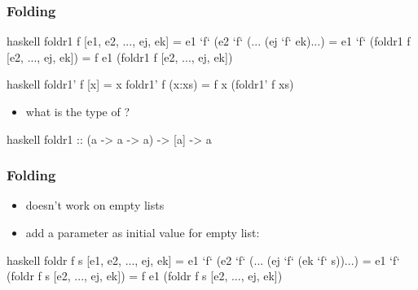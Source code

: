 \documentclass[dvipsnames]{beamer}
\theoremstyle{plain}
\begin{document}
\begin{frame}[fragile]
  \frametitle{Folding}

  \begin{block}{}
    \begin{pygments}{haskell}
foldr1 f [e1, e2, ..., ej, ek]
    = e1 `f` (e2 `f` (... (ej `f` ek)...)
    = e1 `f` (foldr1 f [e2, ..., ej, ek])
    = f e1 (foldr1 f [e2, ..., ej, ek])
    \end{pygments}
  \end{block}

  \pause
  \begin{exampleblock}{}
    \begin{pygments}{haskell}
foldr1' f [x]    = x
foldr1' f (x:xs) = f x (foldr1' f xs)
    \end{pygments}
  \end{exampleblock}

  \begin{itemize}
    \item what is the type of ?
  \end{itemize}

  \pause
  \begin{pygments}{haskell}
foldr1 :: (a -> a -> a) -> [a] -> a
  \end{pygments}
\end{frame}

\begin{frame}[fragile]
  \frametitle{Folding}

  \begin{itemize}
    \item {} doesn't work on empty lists

    \pause
    \medskip
    \item add a parameter as initial value for empty list:
  \end{itemize}

  \begin{block}{}
    \begin{pygments}{haskell}
foldr f s [e1, e2, ..., ej, ek]
    = e1 `f` (e2 `f` (... (ej `f` (ek `f` s))...)
    = e1 `f` (foldr f s [e2, ..., ej, ek])
    = f e1 (foldr f s [e2, ..., ej, ek])
    \end{pygments}
  \end{block}
\end{frame}
\end{document}
